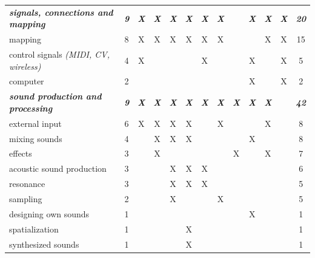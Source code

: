 \documentclass[letterpaper, 12pt]{article}
\begin{document}
\begin{spacing}{1.1}
\begin{supertabular}{L{5.5cm}cccccccccccc}
        \emph{\textbf{signals, connections and mapping}} & \emph{\textbf{9}} & \emph{\textbf{X}} & \emph{\textbf{X}} & \emph{\textbf{X}} & \emph{\textbf{X}} & \emph{\textbf{X}} & \emph{\textbf{X}} & & \emph{\textbf{X}} & \emph{\textbf{X}} & \emph{\textbf{X}} & \emph{\textbf{20}} \\
        mapping                          & 8  & X & X & X & X & X & X &   &   & X & X & 15 \\
        control signals \emph{(MIDI, CV, wireless)} & 4  & X &   &   &   & X &   &   & X &   & X & 5  \\ 
        computer                         & 2  &   &   &   &   &   &   &   & X &   & X & 2  \\
        \hline
        \emph{\textbf{sound production and processing}} & \emph{\textbf{9}} & \emph{\textbf{X}} & \emph{\textbf{X}}    & \emph{\textbf{X}} & \emph{\textbf{X}} & \emph{\textbf{X}} & \emph{\textbf    {X}} & \emph{\textbf{X}} & \emph{\textbf{X}} & \emph{\textbf{X}} & & \emph  {\textbf{42}} \\
        external input                   & 6  & X & X & X & X &   & X &   &   & X &   & 8  \\
        mixing sounds                    & 4  &   & X & X & X &   &   &   & X &   &   & 8  \\
        effects                          & 3  &   & X &   &   &   &   & X &   & X &   & 7  \\
        acoustic sound production        & 3  &   &   & X & X & X &   &   &   &   &   & 6  \\
        resonance                        & 3  &   &   & X & X & X &   &   &   &   &   & 5  \\
        sampling                         & 2  &   &   & X &   &   & X &   &   &   &   & 5  \\
        designing own sounds             & 1  &   &   &   &   &   &   &   & X &   &   & 1  \\
        spatialization                   & 1  &   &   &   & X &   &   &   &   &   &   & 1  \\
        synthesized sounds               & 1  &   &   &   & X &   &   &   &   &   &   & 1  \\
        \hline
        

\end{supertabular}
\end{spacing}
\end{document}
